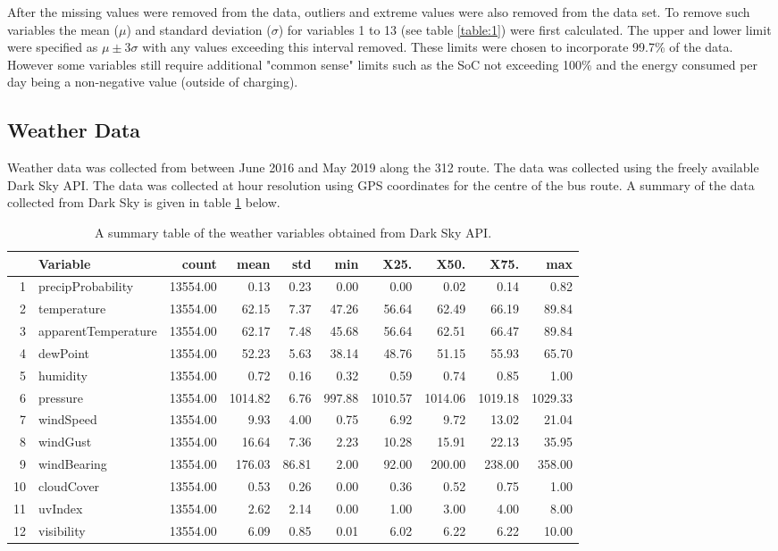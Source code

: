 \documentclass{article}
\begin{document}
After the missing values were removed from the data, outliers and extreme values were also removed from the data set. To remove such variables the mean ($\mu$) and standard deviation ($\sigma$) for variables 1 to 13 (see table \ref{table:1}) were first calculated. The upper and lower limit were specified as $\mu \pm 3\sigma$ with any values exceeding this interval removed. These limits were chosen to incorporate 99.7\% of the data. However some variables still require additional "common sense" limits such as the SoC not exceeding 100\% and the energy consumed per day being a non-negative value (outside of charging).

\subsection{Weather Data}

Weather data was collected from between June 2016 and May 2019 along the 312 route. The data was collected using the freely available Dark Sky API. The data was collected at hour resolution using GPS coordinates for the centre of the bus route. A summary of the data collected from Dark Sky is given in table \ref{table:weather} below.

\begin{table}[h!]
\centering
\begin{tabular}{rlrrrrrrrr}
  \hline
 & Variable & count & mean & std & min & X25. & X50. & X75. & max \\ 
  \hline
1 & precipProbability & 13554.00 & 0.13 & 0.23 & 0.00 & 0.00 & 0.02 & 0.14 & 0.82 \\ 
  2 & temperature & 13554.00 & 62.15 & 7.37 & 47.26 & 56.64 & 62.49 & 66.19 & 89.84 \\ 
  3 & apparentTemperature & 13554.00 & 62.17 & 7.48 & 45.68 & 56.64 & 62.51 & 66.47 & 89.84 \\ 
  4 & dewPoint & 13554.00 & 52.23 & 5.63 & 38.14 & 48.76 & 51.15 & 55.93 & 65.70 \\ 
  5 & humidity & 13554.00 & 0.72 & 0.16 & 0.32 & 0.59 & 0.74 & 0.85 & 1.00 \\ 
  6 & pressure & 13554.00 & 1014.82 & 6.76 & 997.88 & 1010.57 & 1014.06 & 1019.18 & 1029.33 \\ 
  7 & windSpeed & 13554.00 & 9.93 & 4.00 & 0.75 & 6.92 & 9.72 & 13.02 & 21.04 \\ 
  8 & windGust & 13554.00 & 16.64 & 7.36 & 2.23 & 10.28 & 15.91 & 22.13 & 35.95 \\ 
  9 & windBearing & 13554.00 & 176.03 & 86.81 & 2.00 & 92.00 & 200.00 & 238.00 & 358.00 \\ 
  10 & cloudCover & 13554.00 & 0.53 & 0.26 & 0.00 & 0.36 & 0.52 & 0.75 & 1.00 \\ 
  11 & uvIndex & 13554.00 & 2.62 & 2.14 & 0.00 & 1.00 & 3.00 & 4.00 & 8.00 \\ 
  12 & visibility & 13554.00 & 6.09 & 0.85 & 0.01 & 6.02 & 6.22 & 6.22 & 10.00 \\ 
   \hline
\end{tabular}
\caption{A summary table of the weather variables obtained from Dark Sky API.}
\label{table:weather}
\end{table}
\end{document}
